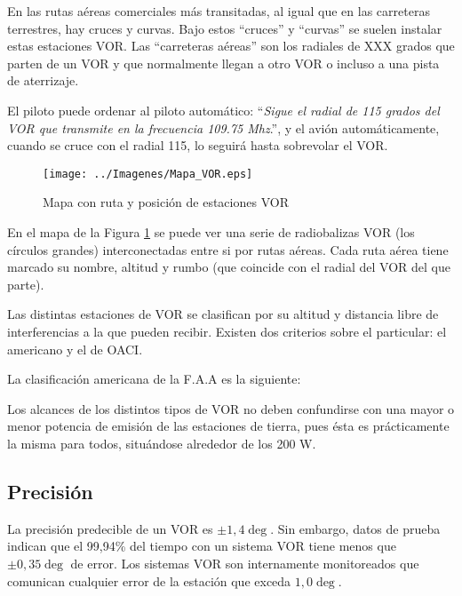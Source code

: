En las rutas aéreas comerciales más transitadas, al igual que en las carreteras terrestres, hay cruces y curvas. Bajo estos ``cruces'' y ``curvas'' se suelen instalar estas estaciones VOR. Las ``carreteras aéreas'' son los radiales de XXX grados que parten de un VOR y que normalmente llegan a otro VOR o incluso a una pista de aterrizaje.

El piloto puede ordenar al piloto automático: ``\textit{Sigue el radial de 115 grados del VOR que transmite en la frecuencia 109.75 Mhz}.'', y el avión automáticamente, cuando se cruce con el radial 115, lo seguirá hasta sobrevolar el VOR.

\begin{figure} [ht]
 \centering
 \texttt{[image: ../Imagenes/Mapa\_VOR.eps]}
 \caption{Mapa con ruta y posición de estaciones VOR}
 \label{Mapa_estaciones_VOR}
\end{figure}

En el mapa de la Figura  \ref{Mapa_estaciones_VOR} se puede ver una serie de radiobalizas VOR (los círculos grandes) interconectadas entre si por rutas aéreas. Cada ruta aérea tiene marcado su nombre, altitud y rumbo (que coincide con el radial del VOR del que parte).

Las distintas estaciones de VOR se clasifican por su altitud y distancia libre de interferencias a la que pueden recibir. Existen dos criterios sobre el 
particular: el americano y el de OACI.

La clasificación americana de la F.A.A es la siguiente:


Los alcances de los distintos tipos de VOR  no deben confundirse con una mayor o menor potencia de emisión de las estaciones de tierra, pues ésta es prácticamente la misma para todos, situándose alrededor  de los 200 W.

\subsection*{Precisión}
\label{sec: Presicion}
La precisión predecible de un VOR es $\pm 1,4 \deg$. Sin embargo, datos de prueba indican que el 99,94\% del tiempo con un sistema VOR tiene menos que $\pm 0,35 \deg$ de error. Los sistemas VOR son internamente monitoreados que comunican cualquier error de la estación que exceda $1,0 \deg$.

